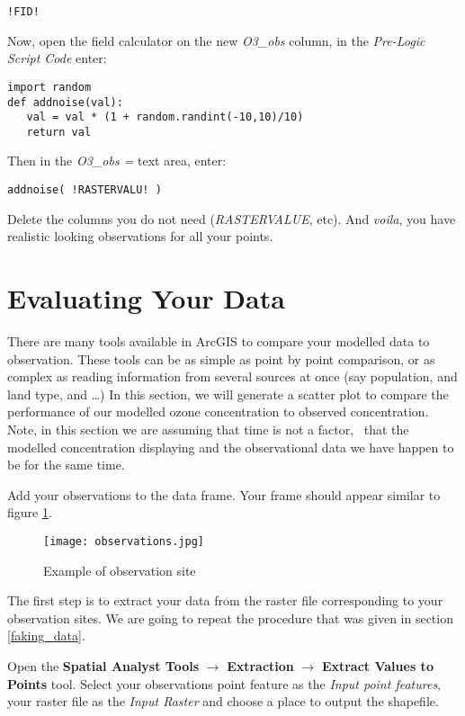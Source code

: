 \singlespace
\begin{verbatim}
!FID!
\end{verbatim}
\doublespace

Now, open the field calculator on the new \emph{O3\_obs} column, in
the \emph{Pre-Logic Script Code} enter:
\singlespace
\begin{verbatim}
import random
def addnoise(val):
   val = val * (1 + random.randint(-10,10)/10)
   return val
\end{verbatim}
\doublespace
\noindent Then in the \emph{O3\_obs = } text area, enter:
\singlespace
\begin{verbatim}
addnoise( !RASTERVALU! )
\end{verbatim}
\doublespace

Delete the columns you do not need (\emph{RASTERVALUE}, etc).  And
\emph{voila}, you have realistic looking observations for all your
points.

\section{Evaluating Your Data}

There are many tools available in ArcGIS to compare your modelled data
to observation.  These tools can be as simple as point by point
comparison, or as complex as reading information from several sources
at once (say population, and land type, and \ldots)  In this section,
we will generate a scatter plot to compare the performance of our
modelled ozone concentration to observed concentration.  Note, in this
section we are assuming that time is not a factor, \ie~that the
modelled concentration displaying and the observational data we have
happen to be for the same time.

Add your observations to the data frame.  Your frame should appear
similar to figure \ref{observations}.

\begin{figure}
	\centering
	\texttt{[image: observations.jpg]}
	\caption{Example of observation site}
	\label{observations}
\end{figure}

The first step is to extract your data from the raster file
corresponding to your observation sites.  We are going to repeat the
procedure that was given in section \ref{faking_data}.

Open the \textbf{Spatial Analyst Tools} $\rightarrow$
\textbf{Extraction} $\rightarrow$ \textbf{Extract Values to Points}
tool.  Select your observations point feature as the \emph{Input point
features}, your raster file as the \emph{Input Raster} and choose a
place to output the shapefile.

